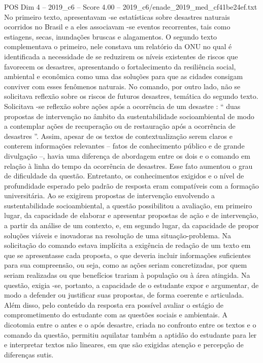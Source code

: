 \begin{textsample}{POS Dim 4 – 2019\_c6 – Score 4.00 – 2019\_c6/enade\_2019\_med\_cf41be24ef.txt}
No primeiro texto, apresentavam -se estatísticas sobre desastres naturais ocorridos no Brasil e a eles associavam -se eventos recorrentes, tais como estiagens, secas, inundações bruscas e alagamentos.
O segundo texto complementava o primeiro, nele constava um relatório da ONU no qual é identificada a necessidade de se reduzirem os níveis existentes de riscos que favorecem os desastres, apresentando o fortalecimento da resiliência social, ambiental e econômica como uma das soluções para que as cidades consigam conviver com esses fenômenos naturais.
No comando, por outro lado, não se solicitava reflexão sobre os riscos de futuros desastres, temática do segundo texto.
Solicitava -se reflexão sobre ações após a ocorrência de um desastre : “ duas propostas de intervenção no âmbito da sustentabilidade socioambiental de modo a contemplar ações de recuperação ou de restauração após a ocorrência de desastres ”.
Assim, apesar de os textos de contextualização serem claros e conterem informações relevantes – fatos de conhecimento público e de grande divulgação –, havia uma diferença de abordagem entre os dois e o comando em relação à linha do tempo da ocorrência de desastres.
Esse fato aumentou o grau de dificuldade da questão.
Entretanto, os conhecimentos exigidos e o nível de profundidade esperado pelo padrão de resposta eram compatíveis com a formação universitária.
Ao se exigirem propostas de intervenção envolvendo a sustentabilidade socioambiental, a questão possibilitou a avaliação, em primeiro lugar, da capacidade de elaborar e apresentar propostas de ação e de intervenção, a partir da análise de um contexto, e, em segundo lugar, da capacidade de propor soluções viáveis e inovadoras na resolução de uma situação-problema.
Na solicitação do comando estava implícita a exigência de redação de um texto em que se apresentasse cada proposta, o que deveria incluir informações suficientes para sua compreensão, ou seja, como as ações seriam concretizadas, por quem seriam realizadas ou que benefícios trariam à população ou à área atingida.
Na questão, exigia -se, portanto, a capacidade de o estudante expor e argumentar, de modo a defender ou justificar suas propostas, de forma coerente e articulada.
Além disso, pelo conteúdo da resposta era possível avaliar o estágio de comprometimento do estudante com as questões sociais e ambientais.
A dicotomia entre o antes e o após desastre, criada no confronto entre os textos e o comando da questão, permitiu aquilatar também a aptidão do estudante para ler e interpretar textos não lineares, em que são exigidas atenção e percepção de diferenças sutis.

\end{textsample}

